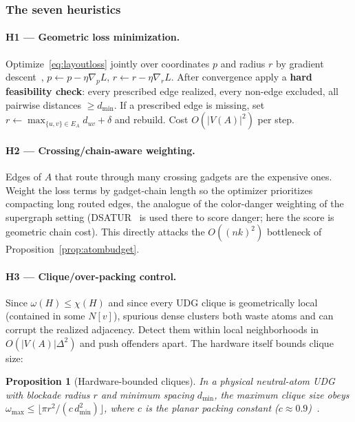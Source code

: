 \documentclass[11pt]{article}
\newtheorem{proposition}[theorem]{Proposition}
\theoremstyle{definition}
\theoremstyle{remark}
\begin{document}
\subsubsection{The seven heuristics}
\label{sec:seven}

\paragraph{H1 --- Geometric loss minimization.} Optimize~\eqref{eq:layoutloss} jointly
over coordinates $p$ and radius $r$ by gradient
descent~\cite{Nesterov2004,Boyd2004}, $p\leftarrow p-\eta\nabla_p L$,
$r\leftarrow r-\eta\nabla_r L$. After convergence apply a \textbf{hard feasibility
check}: every prescribed edge realized, every non-edge excluded, all pairwise distances
$\ge d_{\min}$. If a prescribed edge is missing, set
$r\leftarrow\max_{\{u,v\}\in E_A}d_{uv}+\delta$ and rebuild. Cost $O(|V(A)|^2)$ per
step.

\paragraph{H2 --- Crossing/chain-aware weighting.} Edges of $A$ that route through many
crossing gadgets are the expensive ones. Weight the loss terms by gadget-chain length so
the optimizer prioritizes compacting long routed edges, the analogue of the
color-danger weighting of the supergraph setting (DSATUR~\cite{Brelaz1979} is used there
to score danger; here the score is geometric chain cost). This directly attacks the
$O((nk)^2)$ bottleneck of Proposition~\ref{prop:atombudget}.

\paragraph{H3 --- Clique/over-packing control.} Since $\omega(H)\le\chi(H)$ and since
every UDG clique is geometrically local (contained in some $N[v]$), spurious dense
clusters both waste atoms and can corrupt the realized adjacency. Detect them within
local neighborhoods in $O(|V(A)|\Delta^2)$ and push offenders apart. The hardware itself
bounds clique size:

\begin{proposition}[Hardware-bounded cliques]
\label{prop:hwclique}
In a physical neutral-atom UDG with blockade radius $r$ and minimum spacing $d_{\min}$,
the maximum clique size obeys $\omega_{\max}\le\bigl\lfloor \pi r^2 /
(c\,d_{\min}^2)\bigr\rfloor$, where $c$ is the planar packing constant ($c\approx
0.9$)~\cite{Heppes2003}.
\end{proposition}
\end{document}
